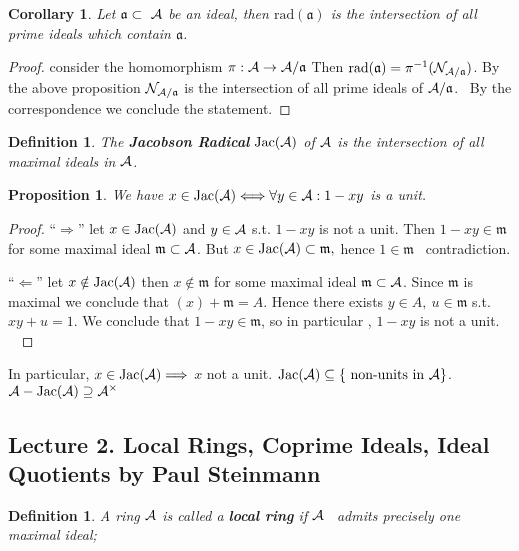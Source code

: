 \documentclass[11pt]{article}
\newtheorem{prop}[thm]{Proposition}
\newtheorem{cor}[thm]{Corollary}
\newtheorem{dfn}[thm]{Definition}
\newcommand{\sca}{{\mathfrak a}}
\newcommand{\scm}{{\mathfrak m}}
\newcommand{\cala}{{\cal A}}
\newcommand{\caln}{{\cal N}}
\newcommand{\Lrta}{\Longrightarrow}
\begin{document}
\begin{cor}
Let $\sca\subset  \cala $ be an ideal, then $\text{rad}(\sca)$ is the intersection of all prime ideals which contain $\sca$.
\end{cor}
\begin{proof}
consider the homomorphism $\pi :\cala\rightarrow \cala/\sca$
Then $\text{rad}(\sca)=\pi^{-1}(\caln_{\cala/\sca})$.
By the above proposition $\caln_{\cala/\sca}$ is the intersection of all prime ideals of $\cala/\sca$.
 By the correspondence we conclude the statement.
\end{proof}
\begin{dfn}
 The \textbf{Jacobson Radical} $\text{Jac}(\cala)$ of $\cala$ is the intersection of all maximal ideals in $\cala$.
\end{dfn}
\begin{prop}\label{prop:criterion_jacobson_radical}
We have 
$x\in \text{Jac}(\cala)\Longleftrightarrow \forall y \in \cala: 1-xy $ is a unit.
\end{prop}
\begin{proof}
``$\Longrightarrow$'' let $x\in \text{Jac}(\cala)$ and $y\in \cala$ s.t. $1-xy$ is not a unit. Then $1-xy\in \scm$ for some maximal ideal 
$\scm \subset \cala$. But $x\in \text{Jac}(\cala)\subset \scm,$ hence $1\in \scm$  contradiction.

``$\Longleftarrow$'' let $x  \notin \text{Jac}(\cala)$ then $x \notin \scm$ for some maximal ideal $\scm\subset \cala$.
Since $\scm$ is maximal we conclude that $(x)+\scm=A$. Hence there exists $y\in A,\   u\in \scm$ s.t. $xy+u=1$.
We conclude that $1-xy \in \scm $, so in particular , $1-xy$ is not a unit.
 \end{proof}
In particular, $x\in\text{Jac}(\cala)\Lrta$ $x$ not  a unit. $\text{Jac}(\cala)\subseteq \{\text{ non-units in $\cala$}\}$. $\cala-\text{Jac}(\cala)\supseteq\cala^{\times}$
\subsection{Lecture 2. Local Rings, Coprime Ideals, Ideal Quotients by Paul Steinmann}
\begin{dfn}
A ring $\cala$ is called a \textbf{local ring} if $\cala$  admits precisely one maximal ideal;
\end{dfn}
\end{document}
